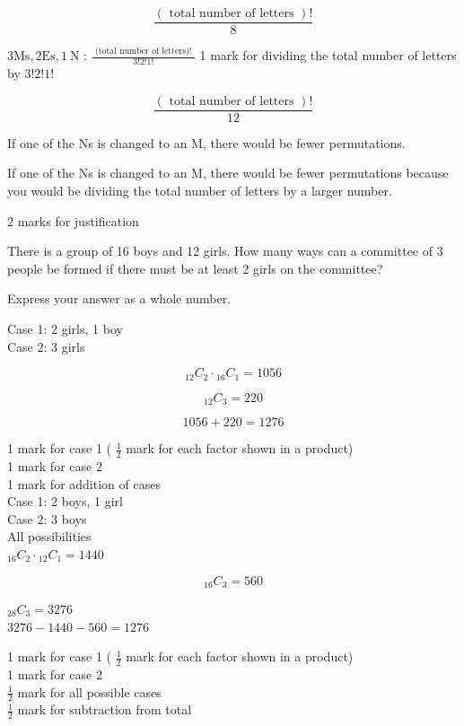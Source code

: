\documentclass[12pt,addpoints]{exam}
\begin{document}
\begin{questions}
\begin{solution}
$$
\frac{(\text { total number of letters })!}{8}
$$

$3 \mathrm{Ms}, 2 \mathrm{Es}, 1 \mathrm{~N}$ : $\frac{\text { (total number of letters)! }}{3!2!1!}$ 1 mark for dividing the total number of letters by $3!2!1!$

$$
\frac{(\text { total number of letters })!}{12}
$$

If one of the Ns is changed to an M, there would be fewer permutations.


If one of the Ns is changed to an M, there would be fewer permutations because you would be dividing the total number of letters by a larger number.

2 marks for justification\\
\end{solution}

\question[2]
There is a group of 16 boys and 12 girls. How many ways can a committee of 3 people be formed if there must be at least 2 girls on the committee?

Express your answer as a whole number.

\begin{solution}
Case 1: 2 girls, 1 boy\\
Case 2: 3 girls

$$
{ }_{12} C_{2} \cdot{ }_{16} C_{1}=1056
$$

$$
{ }_{12} C_{3}=220
$$

$$
1056+220=1276
$$

1 mark for case 1 ( $\frac{1}{2}$ mark for each factor shown in a product)\\
1 mark for case 2\\
1 mark for addition of cases\\

Case 1: 2 boys, 1 girl\\
Case 2: 3 boys\\
All possibilities\\
${ }_{16} C_{2} \cdot{ }_{12} C_{1}=1440$

$$
{ }_{16} C_{3}=560
$$

${ }_{28} C_{3}=3276$\\
$3276-1440-560=1276$

1 mark for case 1 ( $\frac{1}{2}$ mark for each factor shown in a product)\\
1 mark for case 2\\
$\frac{1}{2}$ mark for all possible cases\\
$\frac{1}{2}$ mark for subtraction from total\\


\end{solution}
\end{questions}
\end{document}
